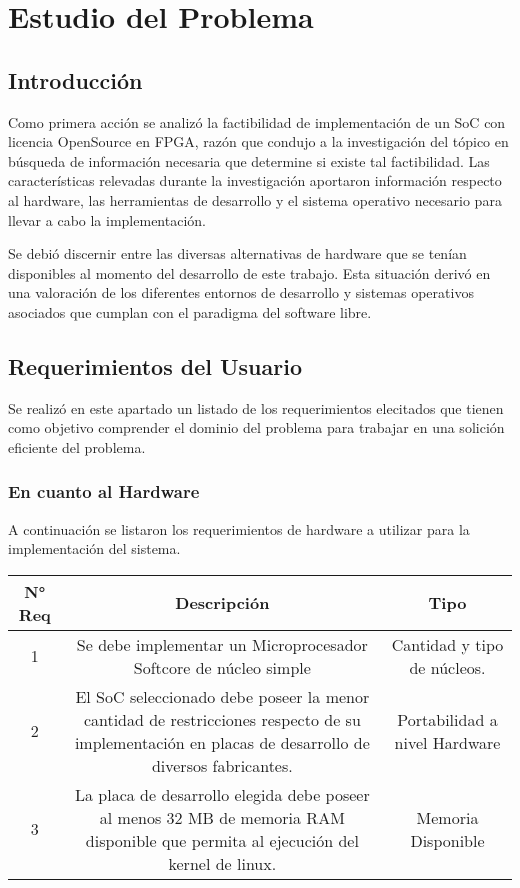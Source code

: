 \chapter{Estudio del Problema}
	\section{Introducción}
	Como primera acción se analizó la factibilidad de implementación de un
	SoC con licencia OpenSource en FPGA, razón que condujo a la investigación del
	tópico en búsqueda de información necesaria que determine si existe
	tal factibilidad. Las características relevadas durante la investigación
	aportaron información respecto al hardware, las herramientas de desarrollo y
	el sistema operativo necesario para llevar a cabo la implementación. 
	
	Se debió discernir entre las diversas alternativas de hardware que se tenían
	disponibles al momento del desarrollo de este trabajo. Esta situación derivó en
	una valoración de los diferentes entornos de desarrollo y sistemas operativos 
	asociados que cumplan con el paradigma del software libre. 
	
	\section{Requerimientos del Usuario}
	Se realizó en este apartado un listado de los requerimientos elecitados que
	tienen como objetivo comprender el dominio del problema para trabajar en una
	solición eficiente del problema.
		\subsection{En cuanto al Hardware}
		A continuación se listaron los requerimientos de hardware a utilizar para la
		implementación del sistema.
		
		\begin{tabular}{||c|c|c||}
		\hline
		N° Req & Descripción  & Tipo\\
		\hline
		1 &  Se debe implementar un Microprocesador Softcore de núcleo simple &
		Cantidad y tipo de núcleos. \\
		2 &  El SoC seleccionado debe poseer la menor cantidad de restricciones
		respecto de su implementación en placas de desarrollo de diversos fabricantes.
		& Portabilidad a nivel Hardware\\
		3 & La placa de desarrollo elegida debe poseer al menos 32 MB de memoria RAM
		disponible que permita al ejecución del kernel de linux. & Memoria Disponible
		\\
		
		\hline
		\end{tabular}
					
